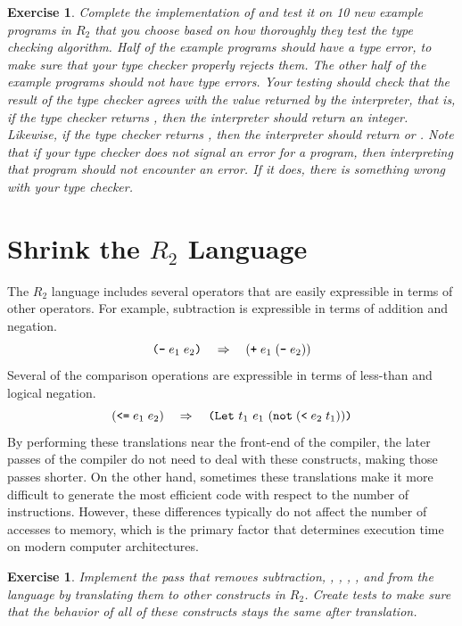 \documentclass[11pt]{book}
\newtheorem{exercise}[theorem]{Exercise}
\begin{document}
\begin{exercise}\normalfont
Complete the implementation of  and test it on 10
new example programs in $R_2$ that you choose based on how thoroughly
they test the type checking algorithm. Half of the example programs
should have a type error, to make sure that your type checker properly
rejects them. The other half of the example programs should not have
type errors. Your testing should check that the result of the type
checker agrees with the value returned by the interpreter, that is, if
the type checker returns , then the interpreter should
return an integer. Likewise, if the type checker returns
, then the interpreter should return  or
. Note that if your type checker does not signal an error
for a program, then interpreting that program should not encounter an
error.  If it does, there is something wrong with your type checker.
\end{exercise}


\section{Shrink the $R_2$ Language}
\label{sec:shrink-r2}

The $R_2$ language includes several operators that are easily
expressible in terms of other operators. For example, subtraction is
expressible in terms of addition and negation.
\[
 \texttt{(-}\; e_1 \; e_2\texttt{)} \quad \Rightarrow \quad (\texttt{+} \; e_1 \; (\texttt{-} \; e_2))
\]
Several of the comparison operations are expressible in terms of
less-than and logical negation.
\[
(\texttt{<=}\; e_1 \; e_2) \quad \Rightarrow \quad
\texttt{(Let}~t_1~e_1~(\texttt{not}\;(\texttt{<}\;e_2\;t_1))\texttt{)}
\]
By performing these translations near the front-end of the compiler,
the later passes of the compiler do not need to deal with these
constructs, making those passes shorter. On the other hand, sometimes
these translations make it more difficult to generate the most
efficient code with respect to the number of instructions. However,
these differences typically do not affect the number of accesses to
memory, which is the primary factor that determines execution time on
modern computer architectures.

\begin{exercise}\normalfont
  Implement the pass  that removes subtraction,
  , , \key{<=}, \key{>}, and \key{>=} from the language
  by translating them to other constructs in $R_2$.  Create tests to
  make sure that the behavior of all of these constructs stays the
  same after translation.
\end{exercise}
\end{document}
